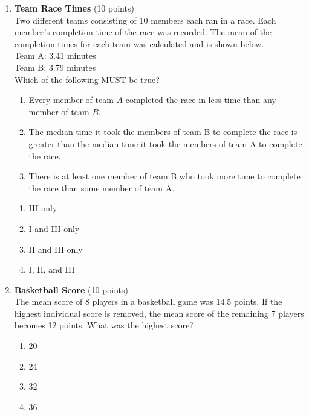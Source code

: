 \begin{enumerate}
  \item \textbf{Team Race Times} (10 points)\\
  Two different teams consisting of 10 members each ran in a race. Each member's completion time of the race was recorded. The mean of the completion times for each team was calculated and is shown below.\\
  Team A: 3.41 minutes\\
  Team B: 3.79 minutes\\
  Which of the following MUST be true?
  \begin{enumerate}[label=(\Roman*)]
    \item Every member of team $A$ completed the race in less time than any member of team $B$.
    \item The median time it took the members of team B to complete the race is greater than the median time it took the members of team A to complete the race.
    \item There is at least one member of team B who took more time to complete the race than some member of team A.
  \end{enumerate}
  \begin{enumerate}[label=(\Alph*)]
    \item III only
    \item I and III only
    \item II and III only
    \item I, II, and III
  \end{enumerate}
  \begin{subanswer}
  \end{subanswer}

  \newpage

  \item \textbf{Basketball Score} (10 points)\\
  The mean score of 8 players in a basketball game was 14.5 points. If the highest individual score is removed, the mean score of the remaining 7 players becomes 12 points. What was the highest score?
  \begin{enumerate}[label=(\Alph*)]
    \item 20
    \item 24
    \item 32
    \item 36
  \end{enumerate}
  \begin{subanswer}
  \end{subanswer}


\end{enumerate}
